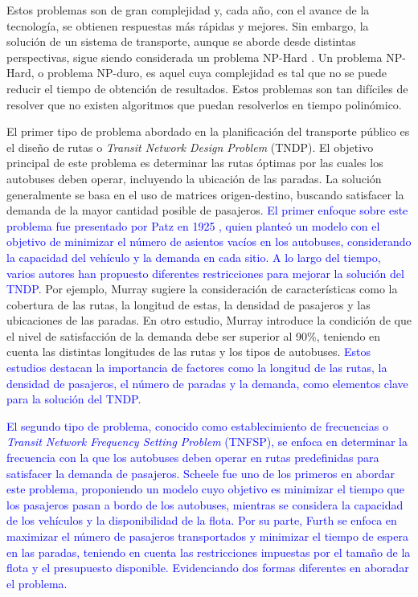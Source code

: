\documentclass[preprint,11pt]{elsarticle}
\newcommand{\Blue}[1]{\textcolor{blue}{#1}}
\begin{document}
Estos problemas son de gran complejidad y, cada año, con el avance de la tecnología, se obtienen respuestas más rápidas y mejores. Sin embargo, la solución de un sistema de transporte, aunque se aborde desde distintas perspectivas, sigue siendo considerada un problema NP-Hard \cite{magnanti1984}. Un problema NP-Hard, o problema NP-duro, es aquel cuya complejidad es tal que no se puede reducir el tiempo de obtención de resultados. Estos problemas son tan difíciles de resolver que no existen algoritmos que puedan resolverlos en tiempo polinómico.

El primer tipo de problema abordado en la planificación del transporte público es el diseño de rutas o \textit{Transit Network Design Problem} (TNDP). El objetivo principal de este problema es determinar las rutas óptimas por las cuales los autobuses deben operar, incluyendo la ubicación de las paradas. La solución generalmente se basa en el uso de matrices origen-destino, buscando satisfacer la demanda de la mayor cantidad posible de pasajeros. \Blue{El primer enfoque sobre este problema fue presentado por Patz en 1925 \parencite{patz1925}, quien planteó un modelo con el objetivo de minimizar el número de asientos vacíos en los autobuses, considerando la capacidad del vehículo y la demanda en cada sitio. A lo largo del tiempo, varios autores han propuesto diferentes restricciones para mejorar la solución del TNDP.} Por ejemplo, Murray \parencite{murray2003} sugiere la consideración de características como la cobertura de las rutas, la longitud de estas, la densidad de pasajeros y las ubicaciones de las paradas. En otro estudio, Murray \parencite{murray1998} introduce la condición de que el nivel de satisfacción de la demanda debe ser superior al 90\%, teniendo en cuenta las distintas longitudes de las rutas y los tipos de autobuses. \Blue{Estos estudios destacan la importancia de factores como la longitud de las rutas, la densidad de pasajeros, el número de paradas y la demanda, como elementos clave para la solución del TNDP.}

\Blue{El segundo tipo de problema, conocido como establecimiento de frecuencias o \textit{Transit Network Frequency Setting Problem} (TNFSP), se enfoca en determinar la frecuencia con la que los autobuses deben operar en rutas predefinidas para satisfacer la demanda de pasajeros. Scheele \parencite{scheele1980} fue uno de los primeros en abordar este problema, proponiendo un modelo cuyo objetivo es minimizar el tiempo que los pasajeros pasan a bordo de los autobuses, mientras se considera la capacidad de los vehículos y la disponibilidad de la flota. Por su parte, Furth \parencite{furth1982} se enfoca en maximizar el número de pasajeros transportados y minimizar el tiempo de espera en las paradas, teniendo en cuenta las restricciones impuestas por el tamaño de la flota y el presupuesto disponible. Evidenciando dos formas diferentes en aboradar el problema.}
\end{document}
